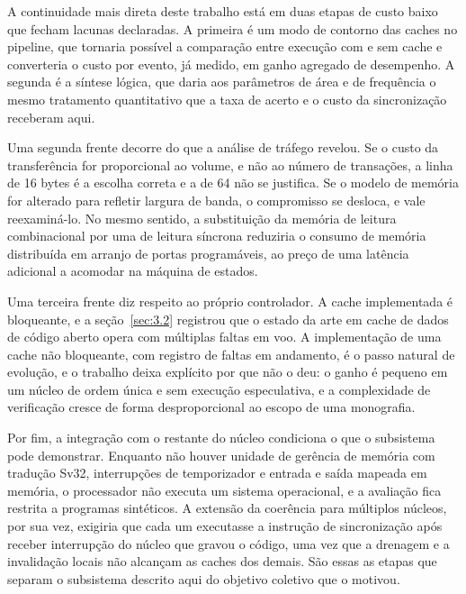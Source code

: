 A continuidade mais direta deste trabalho está em duas etapas de custo baixo que fecham lacunas declaradas. A primeira é um modo de contorno das caches no pipeline, que tornaria possível a comparação entre execução com e sem cache e converteria o custo por evento, já medido, em ganho agregado de desempenho. A segunda é a síntese lógica, que daria aos parâmetros de área e de frequência o mesmo tratamento quantitativo que a taxa de acerto e o custo da sincronização receberam aqui.

Uma segunda frente decorre do que a análise de tráfego revelou. Se o custo da transferência for proporcional ao volume, e não ao número de transações, a linha de 16 bytes é a escolha correta e a de 64 não se justifica. Se o modelo de memória for alterado para refletir largura de banda, o compromisso se desloca, e vale reexaminá-lo. No mesmo sentido, a substituição da memória de leitura combinacional por uma de leitura síncrona reduziria o consumo de memória distribuída em arranjo de portas programáveis, ao preço de uma latência adicional a acomodar na máquina de estados.

Uma terceira frente diz respeito ao próprio controlador. A cache implementada é bloqueante, e a seção~\ref{sec:3.2} registrou que o estado da arte em cache de dados de código aberto opera com múltiplas faltas em voo. A implementação de uma cache não bloqueante, com registro de faltas em andamento, é o passo natural de evolução, e o trabalho deixa explícito por que não o deu: o ganho é pequeno em um núcleo de ordem única e sem execução especulativa, e a complexidade de verificação cresce de forma desproporcional ao escopo de uma monografia.

Por fim, a integração com o restante do núcleo condiciona o que o subsistema pode demonstrar. Enquanto não houver unidade de gerência de memória com tradução Sv32, interrupções de temporizador e entrada e saída mapeada em memória, o processador não executa um sistema operacional, e a avaliação fica restrita a programas sintéticos. A extensão da coerência para múltiplos núcleos, por sua vez, exigiria que cada um executasse a instrução de sincronização após receber interrupção do núcleo que gravou o código, uma vez que a drenagem e a invalidação locais não alcançam as caches dos demais. São essas as etapas que separam o subsistema descrito aqui do objetivo coletivo que o motivou.
